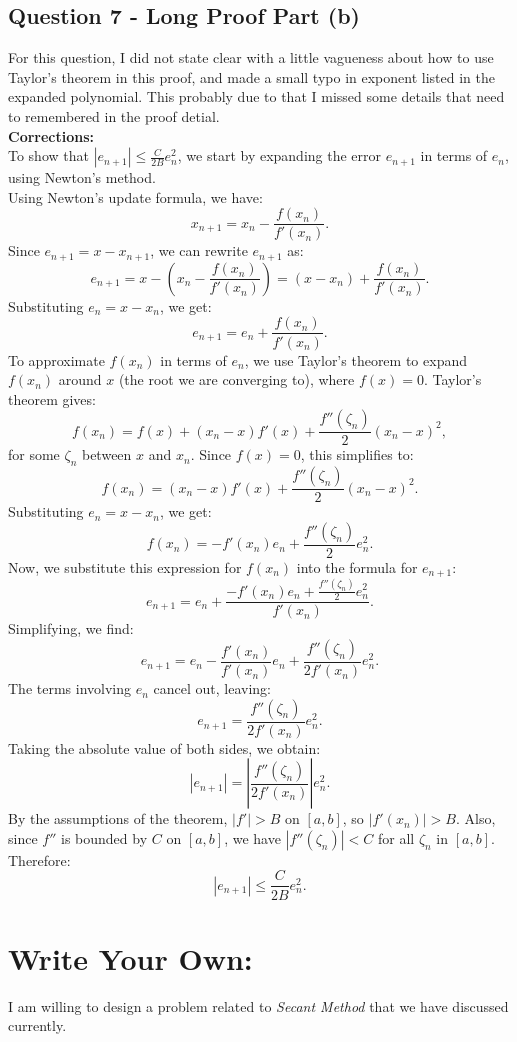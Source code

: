 \documentclass[12pt]{article}
\begin{document}
\subsection*{Question 7 - Long Proof Part (b)}
For this question, I did not state clear with a little vagueness about how to use Taylor's theorem in this proof, and made a small typo in exponent listed in the expanded polynomial. 
This probably due to that I missed some details that need to remembered in the proof detial.
\\
\textbf{Corrections: }
\\
To show that \( |e_{n+1}| \leq \frac{C}{2B} e_n^2 \), we start by expanding the error \( e_{n+1} \) in terms of \( e_n \), using Newton’s method.
\\
Using Newton's update formula, we have:
\[
   x_{n+1} = x_n - \frac{f(x_n)}{f'(x_n)}.
\]
Since \( e_{n+1} = x - x_{n+1} \), we can rewrite \( e_{n+1} \) as:
\[
   e_{n+1} = x - \left( x_n - \frac{f(x_n)}{f'(x_n)} \right) = (x - x_n) + \frac{f(x_n)}{f'(x_n)}.
\]
Substituting \( e_n = x - x_n \), we get:
\[
   e_{n+1} = e_n + \frac{f(x_n)}{f'(x_n)}.
\]
To approximate \( f(x_n) \) in terms of \( e_n \), we use Taylor’s theorem to expand \( f(x_n) \) around \( x \) (the root we are converging to), where \( f(x) = 0 \). Taylor’s theorem gives:
\[
   f(x_n) = f(x) + (x_n - x) f'(x) + \frac{f''(\zeta_n)}{2} (x_n - x)^2,
\]
for some \( \zeta_n \) between \( x \) and \( x_n \). Since \( f(x) = 0 \), this simplifies to:
\[
   f(x_n) = (x_n - x) f'(x) + \frac{f''(\zeta_n)}{2} (x_n - x)^2.
\]
Substituting \( e_n = x - x_n \), we get:
\[
   f(x_n) = -f'(x_n) e_n + \frac{f''(\zeta_n)}{2} e_n^2.
\]
Now, we substitute this expression for \( f(x_n) \) into the formula for \( e_{n+1} \):
\[
   e_{n+1} = e_n + \frac{-f'(x_n) e_n + \frac{f''(\zeta_n)}{2} e_n^2}{f'(x_n)}.
\]
Simplifying, we find:
\[
   e_{n+1} = e_n - \frac{f'(x_n)}{f'(x_n)} e_n + \frac{f''(\zeta_n)}{2 f'(x_n)} e_n^2.
\]
The terms involving \( e_n \) cancel out, leaving:
\[
   e_{n+1} = \frac{f''(\zeta_n)}{2 f'(x_n)} e_n^2.
\]
Taking the absolute value of both sides, we obtain:
\[
   |e_{n+1}| = \left| \frac{f''(\zeta_n)}{2 f'(x_n)} \right| e_n^2.
\]
By the assumptions of the theorem, \( |f'| > B \) on \( [a, b] \), so \( |f'(x_n)| > B \). Also, since \( f'' \) is bounded by \( C \) on \( [a, b] \), we have \( |f''(\zeta_n)| < C \) for all \( \zeta_n \) in \( [a, b] \). Therefore:
\[
   |e_{n+1}| \leq \frac{C}{2B} e_n^2.
\]

\section*{Write Your Own: }
I am willing to design a problem related to \textit{Secant Method} that we have discussed currently.
\\
\end{document}
